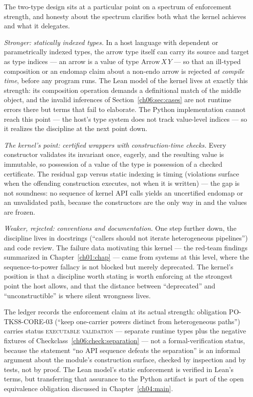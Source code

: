 The two-type design sits at a particular point on a spectrum of
enforcement strength, and honesty about the spectrum clarifies both what
the kernel achieves and what it delegates.

\emph{Stronger: statically indexed types.} In a host language with
dependent or parametrically indexed types, the arrow type itself can carry
its source and target as type indices --- an arrow is a value of type
$\mathrm{Arrow}\,X\,Y$ --- so that an ill-typed composition or an endomap
claim about a non-endo arrow is rejected \emph{at compile time}, before
any program runs. The Lean model of the kernel lives at exactly this
strength: its composition operation demands a definitional match of the
middle object, and the invalid inferences of
Section~\ref{ch06:sec:cases} are not runtime errors there but terms that
fail to elaborate. The Python implementation cannot reach this point ---
the host's type system does not track value-level indices --- so it
realizes the discipline at the next point down.

\emph{The kernel's point: certified wrappers with construction-time
checks.} Every constructor validates its invariant once, eagerly, and the
resulting value is immutable, so possession of a value of the type is
possession of a checked certificate. The residual gap versus static
indexing is timing (violations surface when the offending construction
executes, not when it is written) --- the gap is not soundness: no
sequence of kernel API calls yields an uncertified endomap or an
unvalidated path, because the constructors are the only way in and the
values are frozen.

\emph{Weaker, rejected: conventions and documentation.} One step further
down, the discipline lives in docstrings (``callers should not iterate
heterogeneous pipelines'') and code review. The failure data motivating
this kernel --- the red-team findings summarized in
Chapter~\ref{ch01:chap} --- came from systems at this level, where the
sequence-to-power fallacy is not blocked but merely deprecated. The
kernel's position is that a discipline worth stating is worth enforcing
at the strongest point the host allows, and that the distance between
``deprecated'' and ``unconstructible'' is where silent wrongness lives.

The ledger records the enforcement claim at its actual strength:
obligation PO-TKS8-CORE-03 (``keep one-carrier powers distinct from
heterogeneous paths'') carries status \textsc{executable validation} ---
separate runtime types plus the negative fixtures of
Checkclass~\ref{ch06:check:separation} --- not a formal-verification
status, because the statement ``no API sequence defeats the separation''
is an informal argument about the module's construction surface, checked
by inspection and by tests, not by proof. The Lean model's static
enforcement is verified in Lean's terms, but transferring that assurance
to the Python artifact is part of the open equivalence obligation
discussed in Chapter~\ref{ch04:main}.

